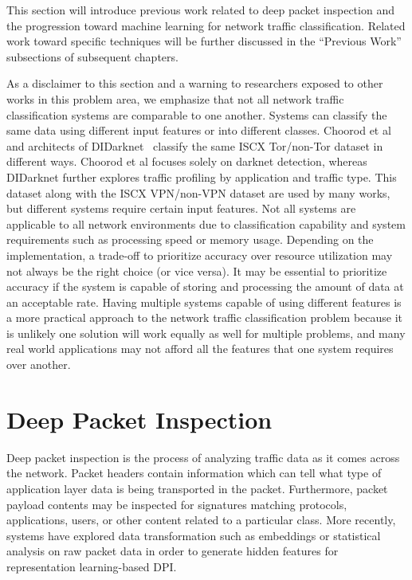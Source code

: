 This section will introduce previous work related to deep packet inspection and the progression toward  machine learning for network traffic classification. Related work toward specific techniques will be further discussed in the ``Previous Work'' subsections of subsequent chapters.

As a disclaimer to this section and a warning to researchers exposed to other works in this problem area, we emphasize that not all network traffic classification systems are comparable to one another. Systems can classify the same data using different input features or into different classes. Choorod et al~\cite{choorod2022tor} and architects of DIDarknet~\cite{didarknet} classify the same ISCX Tor/non-Tor dataset in different ways. Choorod et al focuses solely on darknet detection, whereas DIDarknet further explores traffic profiling by application and traffic type. This dataset along with the ISCX VPN/non-VPN dataset are used by many works, but different systems require certain input features. Not all systems are applicable to all network environments due to classification capability and system requirements such as processing speed or memory usage. Depending on the implementation, a trade-off to prioritize accuracy over resource utilization may not always be the right choice (or vice versa). It may be essential to prioritize accuracy if the system is capable of storing and processing the amount of data at an acceptable rate. Having multiple systems capable of using different features is a more practical approach to the network traffic classification problem because it is unlikely one solution will work equally as well for multiple problems, and many real world applications may not afford all the features that one system requires over another.


\section{Deep Packet Inspection}
Deep packet inspection is the process of analyzing traffic data as it comes across the network. Packet headers contain information which can tell what type of application layer data is being transported in the packet. Furthermore, packet payload contents may be inspected for signatures matching protocols, applications, users, or other content related to a particular class. More recently, systems have explored data transformation such as embeddings or statistical analysis on raw packet data in order to generate hidden features for representation learning-based DPI.

